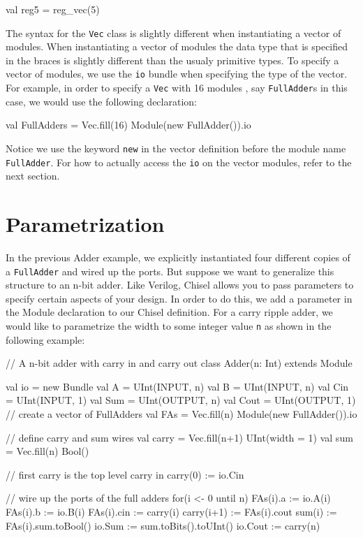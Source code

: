 \begin{scala}
val reg5 = reg_vec(5)
\end{scala}

The syntax for the \verb+Vec+ class is slightly different when instantiating a vector of modules. When instantiating a vector of modules the data type that is specified in the {} braces is slightly different than the usualy primitive types. To specify a vector of modules, we use the \verb+io+ bundle when specifying the type of the vector. For example, in order to specify a \verb+Vec+ with 16 modules , say \verb+FullAdder+s in this case, we would use the following declaration:

\begin{scala}
val FullAdders = 
  Vec.fill(16){ Module(new FullAdder()).io }
\end{scala}

Notice we use the keyword \verb+new+ in the vector definition before the module name \verb+FullAdder+. For how to actually access the \verb+io+ on the vector modules, refer to the next section.

\section{Parametrization}

In the previous Adder example, we explicitly instantiated four different copies of a \verb+FullAdder+ and wired up the ports. But suppose we want to generalize this structure to an n-bit adder. Like Verilog, Chisel allows you to pass parameters to specify certain aspects of your design. In order to do this, we add a parameter in the Module declaration to our Chisel definition.
For a carry ripple adder, we would like to parametrize the width to some integer value \verb+n+ as shown in the following example:

\begin{scala}

// A n-bit adder with carry in and carry out
class Adder(n: Int) extends Module {
  val io = new Bundle {
    val A    = UInt(INPUT, n)
    val B    = UInt(INPUT, n)
    val Cin  = UInt(INPUT, 1)
    val Sum  = UInt(OUTPUT, n)
    val Cout = UInt(OUTPUT, 1)
  }
  // create a vector of FullAdders
  val FAs = Vec.fill(n){ Module(new FullAdder()).io }

  // define carry and sum wires
  val carry = Vec.fill(n+1){ UInt(width = 1) }
  val sum   = Vec.fill(n){ Bool() } 

  // first carry is the top level carry in
  carry(0) := io.Cin

  // wire up the ports of the full adders
  for(i <- 0 until n) {
     FAs(i).a   := io.A(i)
     FAs(i).b   := io.B(i)
     FAs(i).cin := carry(i)
     carry(i+1) := FAs(i).cout
     sum(i)     := FAs(i).sum.toBool()
  }
  io.Sum  := sum.toBits().toUInt()
  io.Cout := carry(n)
}

\end{scala}

